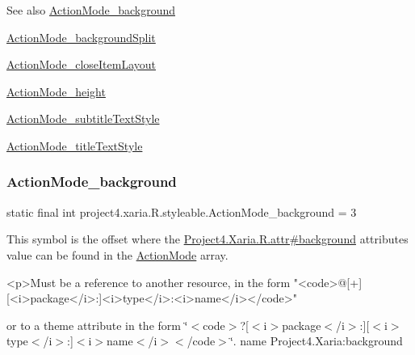 \begin{DoxySeeAlso}{See also}
\hyperlink{classproject4_1_1xaria_1_1R_1_1styleable_ab1a261ccff970c0b57e913757843250e}{Action\+Mode\+\_\+background} 

\hyperlink{classproject4_1_1xaria_1_1R_1_1styleable_a682593862d08e03c043a7c9005f99110}{Action\+Mode\+\_\+background\+Split} 

\hyperlink{classproject4_1_1xaria_1_1R_1_1styleable_a63d571b40c30f57b55825bd03e4d00dc}{Action\+Mode\+\_\+close\+Item\+Layout} 

\hyperlink{classproject4_1_1xaria_1_1R_1_1styleable_a7ca5db9c9a43d5a29fd3ede3ad0266cd}{Action\+Mode\+\_\+height} 

\hyperlink{classproject4_1_1xaria_1_1R_1_1styleable_a1883dbad4265d780ae2a5d8c6b695982}{Action\+Mode\+\_\+subtitle\+Text\+Style} 

\hyperlink{classproject4_1_1xaria_1_1R_1_1styleable_ac6453b7ab2d44d00d3056c12483f92cb}{Action\+Mode\+\_\+title\+Text\+Style} 
\end{DoxySeeAlso}
\mbox{\label{classproject4_1_1xaria_1_1R_1_1styleable_ab1a261ccff970c0b57e913757843250e}} 
\subsubsection{\texorpdfstring{Action\+Mode\+\_\+background}{ActionMode\_background}}
{\footnotesize\ttfamily static final int project4.\+xaria.\+R.\+styleable.\+Action\+Mode\+\_\+background = 3\hspace{0.3cm}{\ttfamily [static]}}

This symbol is the offset where the \hyperlink{}{Project4.\+Xaria.\+R.\+attr\#background} attribute\textquotesingle{}s value can be found in the \hyperlink{classproject4_1_1xaria_1_1R_1_1styleable_af9c7aa13148c68a1e3b75f513d014daa}{Action\+Mode} array.

\begin{DoxyVerb}      <p>Must be a reference to another resource, in the form "<code>@[+][<i>package</i>:]<i>type</i>:<i>name</i></code>"
\end{DoxyVerb}
 or to a theme attribute in the form \char`\"{}$<$code$>$?\mbox{[}$<$i$>$package$<$/i$>$\+:\mbox{]}\mbox{[}$<$i$>$type$<$/i$>$\+:\mbox{]}$<$i$>$name$<$/i$>$$<$/code$>$\char`\"{}.  name Project4.\+Xaria\+:background \mbox{\label{classproject4_1_1xaria_1_1R_1_1styleable_a682593862d08e03c043a7c9005f99110}} 
